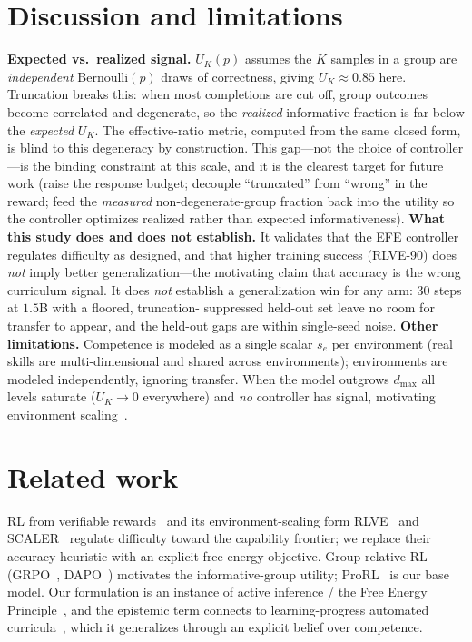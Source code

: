 \documentclass{article}
\newcommand{\UK}{U_{K}}
\begin{document}
\section{Discussion and limitations}
\label{sec:discussion}
\textbf{Expected vs.\ realized signal.} $\UK(p)$ assumes the $K$ samples in a
group are \emph{independent} Bernoulli$(p)$ draws of correctness, giving
$\UK\approx0.85$ here. Truncation breaks this: when most completions are cut off,
group outcomes become correlated and degenerate, so the \emph{realized}
informative fraction is far below the \emph{expected} $\UK$. The effective-ratio
metric, computed from the same closed form, is blind to this degeneracy by
construction. This gap---not the choice of controller---is the binding constraint
at this scale, and it is the clearest target for future work (raise the response
budget; decouple ``truncated'' from ``wrong'' in the reward; feed the
\emph{measured} non-degenerate-group fraction back into the utility so the
controller optimizes realized rather than expected informativeness).
\textbf{What this study does and does not establish.} It validates that the EFE
controller regulates difficulty as designed, and that higher training success
(RLVE-90) does \emph{not} imply better generalization---the motivating claim that
accuracy is the wrong curriculum signal. It does \emph{not} establish a
generalization win for any arm: $30$ steps at $1.5$B with a floored, truncation-
suppressed held-out set leave no room for transfer to appear, and the held-out
gaps are within single-seed noise. \textbf{Other limitations.} Competence is
modeled as a single scalar $s_e$ per environment (real skills are
multi-dimensional and shared across environments); environments are modeled
independently, ignoring transfer. When the model outgrows $d_{\max}$ all levels
saturate ($\UK\!\to\!0$ everywhere) and \emph{no} controller has signal,
motivating environment scaling~\citep{zeng2025rlve,scaler2026}.

\section{Related work}
RL from verifiable rewards~\citep{lambert2024rlhf} and its environment-scaling
form RLVE~\citep{zeng2025rlve} and SCALER~\citep{scaler2026} regulate difficulty
toward the capability frontier; we replace their accuracy heuristic with an
explicit free-energy objective. Group-relative RL (GRPO~\citep{shao2024deepseekmath},
DAPO~\citep{yu2025dapo}) motivates the informative-group utility; ProRL~\citep{liu2025prorl}
is our base model. Our formulation is an instance of active inference / the Free
Energy Principle~\citep{friston2010free,dacosta2020active}, and the epistemic term
connects to learning-progress automated curricula~\citep{graves2017curriculum},
which it generalizes through an explicit belief over competence.
\end{document}
